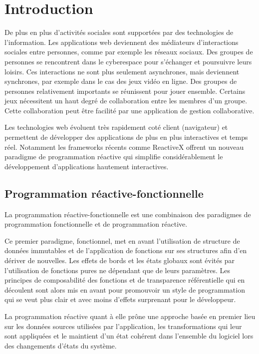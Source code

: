 \chapter{Introduction}

De plus en plus d'activités sociales sont supportées par des technologies de l'information. Les applications web deviennent des médiateurs d'interactions sociales entre personnes, comme par exemple les réseaux sociaux. Des groupes de personnes se rencontrent dans le cyberespace pour s'échanger et poursuivre leurs loisirs. Ces interactions ne sont plus seulement asynchrones, mais deviennent synchrones, par exemple dans le cas des jeux vidéo en ligne. Des groupes de personnes relativement importants se réunissent pour jouer ensemble. Certains jeux nécessitent un haut degré de collaboration entre les membres d'un groupe. Cette collaboration peut être facilité par une application de gestion collaborative.

Les technologies web évoluent très rapidement coté client (navigateur) et permettent de développer des applications de plus en plus interactives et temps réel. Notamment les frameworks récents comme ReactiveX offrent un nouveau paradigme de programmation réactive qui simplifie considérablement le développement d'applications hautement interactives.

\section{Programmation réactive-fonctionnelle}

La programmation réactive-fonctionnelle est une combinaison des paradigmes de programmation fonctionnelle et de programmation réactive.

Ce premier paradigme, fonctionnel, met en avant l'utilisation de structure de données immutables et de l'application de fonctions sur ses structures afin d'en dériver de nouvelles. Les effets de bords et les états globaux sont évités par l'utilisation de fonctions pures ne dépendant que de leurs paramètres. Les principes de composabilité des fonctions et de transparence référentielle qui en découlent sont alors mis en avant pour promouvoir un style de programmation qui se veut plus clair et avec moins d'effets surprenant pour le développeur.

La programmation réactive quant à elle prône une approche basée en premier lieu sur les données sources utilisées par l'application, les transformations qui leur sont appliquées et le maintient d'un état cohérent dans l'ensemble du logiciel lors des changements d'états du système.

